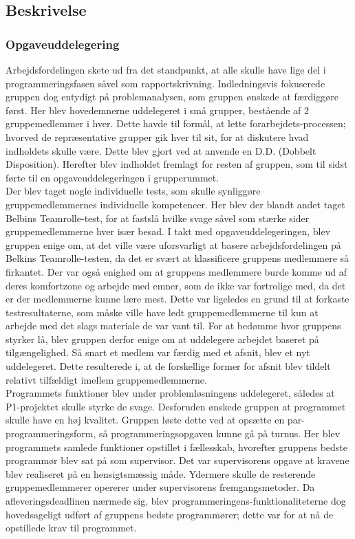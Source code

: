 \subsection{Beskrivelse}
\subsubsection{Opgaveuddelegering}
Arbejdsfordelingen skete ud fra det standpunkt, at alle skulle have lige del i programmeringsfasen såvel som rapportskrivning. Indledningsvis fokuserede gruppen dog entydigt på problemanalysen, som gruppen ønskede at færdiggøre først. Her blev hovedemnerne uddelegeret i små grupper, bestående af 2 gruppemedlemmer i hver. Dette havde til formål, at lette forarbejdets-processen; hvorved de repræsentative grupper gik hver til sit, for at diskutere hvad indholdets skulle være. Dette blev gjort ved at anvende en D.D. (Dobbelt Disposition). Herefter blev indholdet fremlagt for resten af gruppen, som til sidst førte til en opgaveuddelegeringen i grupperummet. \\

Der blev taget nogle individuelle tests, som skulle synliggøre gruppemedlemmernes individuelle kompetencer. Her blev der blandt andet taget Belbins Teamrolle-test, for at fastslå hvilke svage såvel som stærke sider gruppemedlemmerne hver især besad. I takt med opgaveuddelegeringen, blev gruppen enige om, at det ville være uforsvarligt at basere arbejdsfordelingen på Belkins Teamrolle-testen, da det er svært at klassificere gruppens medlemmere så firkantet. Der var også enighed om at gruppens medlemmere burde komme ud af deres komfortzone og arbejde med emner, som de ikke var fortrolige med, da det er der medlemmerne kunne lære mest. Dette var ligeledes en grund til at forkaste testresultaterne, som måske ville have ledt gruppemedlemmerne til kun at arbejde med det slags materiale de var vant til. For at bedømme hvor gruppens styrker lå, blev gruppen derfor enige om at uddelegere arbejdet baseret på tilgængelighed. Så snart et medlem var færdig med et afsnit, blev et nyt uddelegeret. Dette resulterede i, at de forskellige former for afsnit blev tildelt relativt tilfældigt imellem gruppemedlemmerne. \\

Programmets funktioner blev under problemløsningens uddelegeret, således at P1-projektet skulle styrke de svage. Desforuden ønskede gruppen at programmet skulle have en høj kvalitet. Gruppen løste dette ved at opsætte en par-programmeringsform, så programmeringsopgaven kunne gå på turnus. Her blev programmets samlede funktioner opstillet i fællesskab, hvorefter gruppens bedste programmør blev sat på som supervisor. Det var supervisorens opgave at kravene blev realiseret på en hensigtsmæssig måde. Ydermere skulle de resterende gruppemedlemmerer opererer under supervisorens fremgangsmetoder. Da afleveringsdeadlinen nærmede sig, blev programmeringens-funktionaliteterne dog hovedsageligt udført af gruppens bedste programmører; dette var for at nå de opstillede krav til programmet. \\

